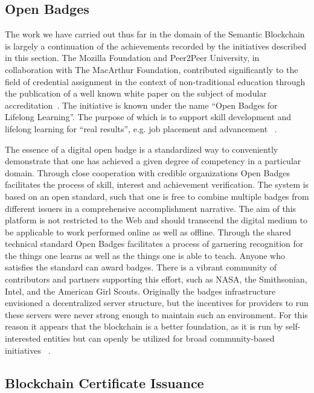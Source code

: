 \subsection{Open Badges}

The work we have carried out thus far in the domain of the Semantic Blockchain is largely a continuation of the achievements recorded by the initiatives described in this section. 
The Mozilla Foundation and Peer2Peer University, in collaboration with The MacArthur Foundation, contributed significantly to the field of credential assignment in the context of non-traditional education through the publication of a well known white paper on the subject of modular accreditation~\cite{schmidt2011can}. 
The initiative is known under the name ``Open Badges for Lifelong Learning''.  
The purpose of which is to support skill development and lifelong learning for ``real results'', e.g. job placement and advancement ~\cite{themozillafoundationpeer2peeruniversityincollaborationwiththemacarthurfoundation2011}.

The essence of a digital open badge is a standardized way to conveniently demonstrate that one has achieved a given degree of competency in a particular domain. 
Through close cooperation with credible organizations Open Badges facilitates the process of skill, interest and achievement verification. 
The system is based on an open standard, such that one is free to combine multiple badges from different issuers in a comprehensive accomplishment narrative. 
The aim of this platform is not restricted to the Web and should transcend the digital medium to be applicable to work performed online as well as offline.
Through the shared technical standard Open Badges facilitates a process of garnering recognition for the things one learns as well as the things one is able to teach. 
Anyone who satisfies the standard can award badges. 
There is a vibrant community of contributors and partners supporting this effort, such as NASA, the Smithsonian, Intel, and the American Girl Scouts. 
Originally the badges infrastructure envisioned a decentralized server structure, but the incentives for providers to run these servers were never strong enough to maintain such an environment.
For this reason it appears that the blockchain is a better foundation, as it is run by self-interested entities but can openly be utilized for broad community-based initiatives ~\cite{philippschmidt2015}.

\subsection{Blockchain Certificate Issuance}

